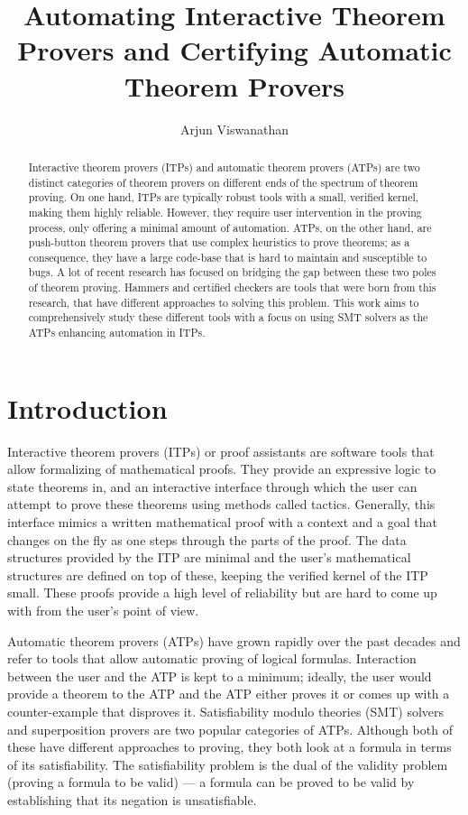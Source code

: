\documentclass{article}
\begin{document}
\title{Automating Interactive Theorem Provers and Certifying Automatic Theorem Provers}
\author{Arjun Viswanathan}
\date{}
\maketitle
\begin{abstract}
	Interactive theorem provers (ITPs) and automatic theorem provers (ATPs)
	are two distinct categories of theorem provers on different ends 
	of the spectrum of theorem proving. 
	On one hand, 
	ITPs are typically robust tools with a small, verified kernel, 
	making them highly reliable. However, they 
	require user intervention in the proving process, only
	offering a minimal amount of automation. ATPs, on the other hand, 
	are push-button theorem provers that use complex heuristics to prove 
	theorems; as a consequence, they have a large code-base that is hard 
	to maintain and susceptible to bugs. A lot of recent research 
	has focused on bridging the gap between these two poles 
	of theorem proving. Hammers and certified checkers 
	are tools that were born from this research, that have different 
	approaches to solving this problem. This work aims to 
	comprehensively study these different tools 
	with a focus on using SMT solvers as
	the ATPs enhancing automation in ITPs.
\end{abstract}

\section{Introduction}
\label{sec:intro}
	Interactive theorem provers (ITPs) or proof assistants are 
	software tools that allow formalizing of mathematical proofs.
	They provide an expressive logic to state theorems in, and 
	an interactive interface through which the user can 
	attempt to prove these theorems using methods 
	called tactics. Generally, this interface mimics a 
	written mathematical proof with a context and a goal 
	that changes on the fly as one steps through the parts 
	of the proof. The data structures provided by the ITP are 
	minimal and the user's mathematical structures are 
	defined on top of these, keeping the verified kernel of the 
	ITP small. These proofs provide a high level of reliability
	but are hard to come up with from the user's point of view. 
	
	Automatic theorem provers (ATPs) have grown rapidly over the 
	past decades and refer to tools that allow automatic proving 
	of logical formulas. Interaction between the user and the 
	ATP is kept to a minimum; ideally, the user would provide a 
	theorem to the ATP and the ATP either proves it or comes up
	with a counter-example that disproves it. 
	Satisfiability modulo theories 
	(SMT) solvers and superposition provers are two 
	popular categories of ATPs.  
	Although both of these have different approaches to 
	proving, they both look at a formula in terms of 
	its satisfiability. The satisfiability problem is the dual 
	of the validity problem (proving a formula to be valid) --- 
	a formula can be proved to be valid by establishing that 
	its negation is unsatisfiable.
	
\end{document}
